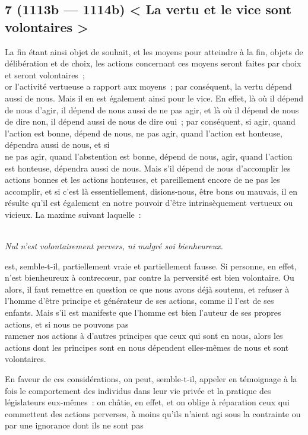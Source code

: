 \documentclass[french,twoside]{book} %
\begin{document}
\subsection[{7 (1113b — 1114b) < La vertu et le vice sont volontaires >}]{7 (1113b — 1114b) < La vertu et le vice sont volontaires >}
\noindent La fin étant ainsi objet de souhait, et les moyens pour atteindre à la fin, objets de délibération et de choix, les actions concernant ces moyens seront faites par choix et seront volontaires ; \\
or l’activité vertueuse a rapport aux moyens ; par conséquent, la vertu dépend aussi de nous. Mais il en est également ainsi pour le vice. En effet, là où il dépend de nous d’agir, il dépend de nous aussi de ne pas agir, et là où il dépend de nous de dire non, il dépend aussi de nous de dire oui ; par conséquent, si agir, quand l’action est bonne, dépend de nous, ne pas agir, quand l’action est honteuse, dépendra aussi de nous, et si \\
ne pas agir, quand l’abstention est bonne, dépend de nous, agir, quand l’action est honteuse, dépendra aussi de nous. Mais s’il dépend de nous d’accomplir les actions bonnes et les actions honteuses, et pareillement encore de ne pas les accomplir, et si c’est là essentiellement, disions-nous, être bons ou mauvais, il en résulte qu’il est également en notre pouvoir d’être intrinsèquement vertueux ou vicieux. La maxime suivant laquelle :\par
 \\
 {\itshape Nul n’est volontairement pervers, ni malgré soi bienheureux.} \par
est, semble-t-il, partiellement vraie et partiellement fausse. Si personne, en effet, n’est bienheureux à contrecœur, par contre la perversité est bien volontaire. Ou alors, il faut remettre en question ce que nous avons déjà soutenu, et refuser à l’homme d’être principe et générateur de ses actions, comme il l’est de ses enfants. Mais s’il est manifeste que l’homme est bien l’auteur de ses propres actions, et si nous ne pouvons pas \\
ramener nos actions à d’autres principes que ceux qui sont en nous, alors les actions dont les principes sont en nous dépendent elles-mêmes de nous et sont volontaires.\par
En faveur de ces considérations, on peut, semble-t-il, appeler en témoignage à la fois le comportement des individus dans leur vie privée et la pratique des législateurs eux-mêmes : on châtie, en effet, et on oblige à réparation ceux qui commettent des actions perverses, à moins qu’ils n’aient agi sous la contrainte ou par une ignorance dont ils ne sont pas \\
\end{document}
